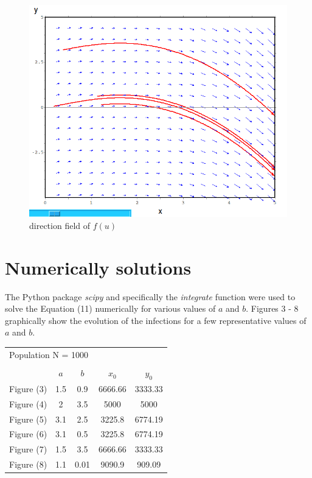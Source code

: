 \documentclass[a4paper]{article}
\begin{document}
\begin{figure}[H]
\centering
\includegraphics[width=1\textwidth]{df.png}
\caption{\label{fig:df}direction field of $f(u)$}
\end{figure}

\section{Numerically solutions}

The Python package \textit{scipy} and specifically the \textit{integrate} function were used to solve the Equation (11) numerically for various
values of $a$ and $b$. Figures 3 - 8 graphically show the evolution of the infections for a few representative values of $a$ and $b$.

\begin{center}
  \begin{tabular}{ | c || c | c | c | c |}
    \hline
    \multicolumn{5}{|l|}{Population N = 1000} \\
    \multicolumn{5}{|c|}{} \\
    \hline
	       & $a$ & $b$ & $x_{0}$ & $y_{0}$ 	\\ \hline 
    Figure (3) & 1.5 & 0.9  & 6666.66 & 3333.33 \\ \hline
    Figure (4) & 2   & 3.5  & 5000    & 5000 	\\ \hline
    Figure (5) & 3.1 & 2.5  & 3225.8  & 6774.19 \\ \hline
    Figure (6) & 3.1 & 0.5  & 3225.8  & 6774.19 \\ \hline
    Figure (7) & 1.5 & 3.5  & 6666.66 & 3333.33 \\ \hline
    Figure (8) & 1.1 & 0.01 & 9090.9  & 909.09 	\\ \hline
    \hline
  \end{tabular}
\end{center}
\end{document}
